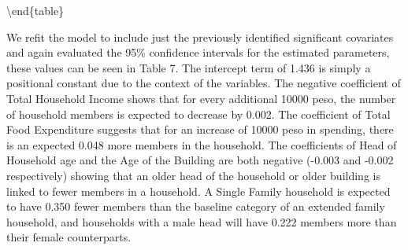 \documentclass[
]{article}
\begin{document}
\textbackslash end\{table\}

We refit the model to include just the previously identified significant
covariates and again evaluated the 95\% confidence intervals for the
estimated parameters, these values can be seen in Table 7. The intercept
term of 1.436 is simply a positional constant due to the context of the
variables. The negative coefficient of Total Household Income shows that
for every additional 10000 peso, the number of household members is
expected to decrease by 0.002. The coefficient of Total Food Expenditure
suggests that for an increase of 10000 peso in spending, there is an
expected 0.048 more members in the household. The coefficients of Head
of Household age and the Age of the Building are both negative (-0.003
and -0.002 respectively) showing that an older head of the household or
older building is linked to fewer members in a household. A Single
Family household is expected to have 0.350 fewer members than the
baseline category of an extended family household, and households with a
male head will have 0.222 members more than their female counterparts.
\end{document}
